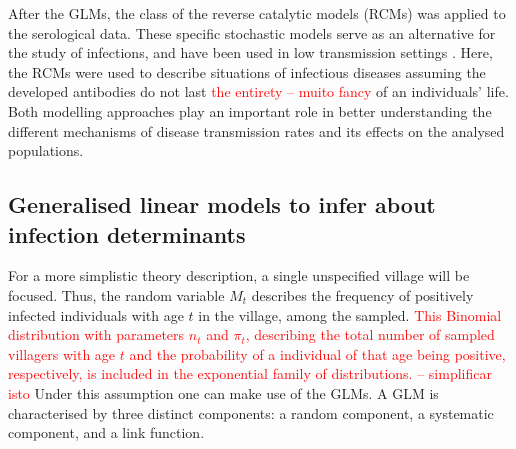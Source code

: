 After the GLMs, the class of the reverse catalytic models (RCMs) was applied to the serological data.
These specific stochastic models serve as an alternative for the study of infections, and have been used in low transmission settings \cite{corran2007serology}.
Here, the RCMs were used to describe situations of infectious diseases assuming the developed antibodies do not last \textcolor{red}{the entirety -- muito fancy} of an individuals' life.
Both modelling approaches play an important role in better understanding the different mechanisms of disease transmission rates and its effects on the analysed populations.



\subsection{Generalised linear models to infer about infection determinants}

For a more simplistic theory description, a single unspecified village will be focused.
Thus, the random variable $M_t$ describes the frequency of positively infected individuals with age $t$ in the village, among the sampled.
\textcolor{red}{This Binomial distribution with parameters $n_t$ and $\pi_t$, describing the total number of sampled villagers with age $t$ and the probability of a individual of that age being positive, respectively, is included in the exponential family of distributions. -- simplificar isto}
Under this assumption one can make use of the GLMs.
A GLM is characterised by three distinct components: a random component, a systematic component, and a link function.

